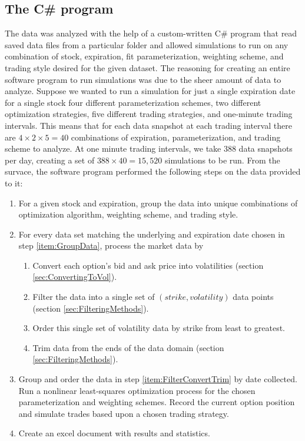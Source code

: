 \documentclass[12pt, a4paper, notitlepage]{article}
\numberwithin{equation}{subsection}
\numberwithin{figure}{subsection}
\numberwithin{table}{subsection}
\newcommand{\newpar}{\newline \newline}
\begin{document}
\subsection{The C\# program}
The data was analyzed with the help of a custom-written C\# program that read saved data files from a particular folder and allowed simulations to run on any combination of stock, expiration, fit parameterization, weighting scheme, and trading style desired for the given dataset.
\newpar
The reasoning for creating an entire software program to run simulations was due to the sheer amount of data to analyze.  Suppose we wanted to run a simulation for just a single expiration date for a single stock four different parameterization schemes, two different optimization strategies, five different trading strategies, and one-minute trading intervals.  This means that for each data snapshot at each trading interval there are $4 \times 2 \times 5 = 40$ combinations of expiration, parameterization, and trading scheme to analyze.  At one minute trading intervals, we take 388 data snapshots per day, creating a set of $388 \times 40 = 15,520$ simulations to be run.
\newpar
From the survace, the software program performed the following steps on the data provided to it:
\begin{enumerate}
	\item For a given stock and expiration, group the data into unique combinations of optimization algorithm, weighting scheme, and trading style.\label{item:GroupData}
    \item For every data set matching the underlying and expiration date chosen in step \ref{item:GroupData}, process the market data by
    \begin{enumerate}
    	 \item Convert each option's bid and ask price into volatilities (section \ref{sec:ConvertingToVol}).
         \item Filter the data into a single set of $(strike, volatility)$ data points (section \ref{sec:FilteringMethods}).
         \item Order this single set of volatility data by strike from least to greatest.
         \item Trim data from the ends of the data domain (section \ref{sec:FilteringMethods}).\label{item:FilterConvertTrim}
    \end{enumerate}
	\item Group and order the data in step \ref{item:FilterConvertTrim} by date collected.  Run a nonlinear least-squares optimization process for the chosen parameterization and weighting schemes.  Record the current option position and simulate trades based upon a chosen trading strategy.
   \item Create an excel document with results and statistics.
\end{enumerate}
\end{document}
